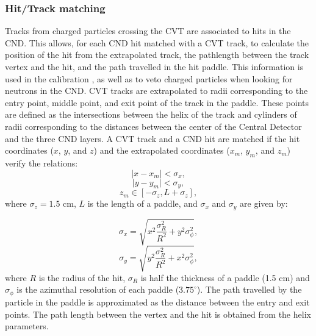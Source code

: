 \subsubsection{Hit/Track matching}
Tracks from charged particles crossing the CVT are associated to hits in the CND. This allows, for each CND hit matched with a CVT track, to calculate the position of the hit from the extrapolated track, the pathlength between the track vertex and the hit, and the path travelled in the hit paddle. This information is used in the calibration \cite{cnd-nim}, as well as to veto charged particles when looking for neutrons in the CND. 
CVT tracks are extrapolated to radii corresponding to the entry point, middle point, and exit point of the track in the paddle. These points are defined as the intersections between the helix of the track and cylinders of radii corresponding to the distances between the center of the Central Detector and the three CND layers.
A CVT track and a CND hit are matched if the hit coordinates ($x$, $y$, and $z$) and the extrapolated coordinates ($x_{m}$, $y_{m}$, and $z_{m}$) verify the relations:
\begin{equation}
\mid x-x_{m} \mid < \sigma_x ,
\end{equation}
\begin{equation}
\mid y-y_{m} \mid < \sigma_y ,
\end{equation}
\begin{equation}
z_{m}  \in [-\sigma_z,L+\sigma_z],
\end{equation}
where $\sigma_z=1.5$ cm, $ L$ is the length of a paddle, and $\sigma_x$ and $\sigma_y$ are given by:

\begin{equation}
\sigma_x= \sqrt{x^{2}\frac{\sigma_{R}^{2}}{R^2}+y^{2}\sigma_{\phi}^{2}},
\end{equation}
\begin{equation}
\sigma_y= \sqrt{y^{2}\frac{\sigma_{R}^{2}}{R^2}+x^{2}\sigma_{\phi}^{2}},
\end{equation}
where $R$ is the radius of the hit, $\sigma_R$ is half the thickness of a paddle (1.5 cm) and $\sigma_{\phi}$ is the azimuthal resolution of each paddle ($3.75^{\circ}$).
%
The path travelled by the particle in the paddle is approximated as the distance between the entry and exit points.
%
The path length between the vertex and the hit is obtained from the helix parameters.

